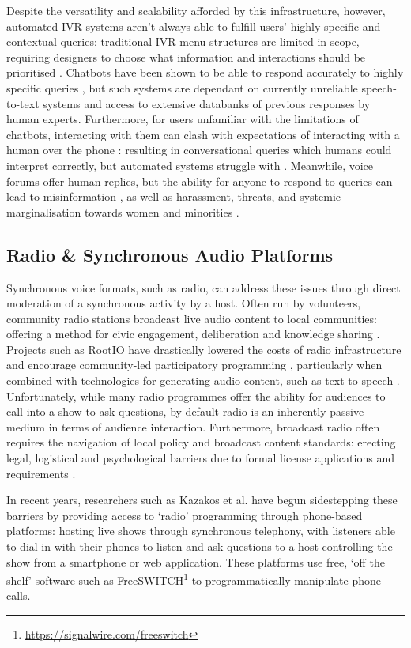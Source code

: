 Despite the versatility and scalability afforded by this infrastructure, however, automated IVR systems aren't always able to fulfill users' highly specific and contextual queries: traditional IVR menu structures are limited in scope, requiring designers to choose what information and interactions should be prioritised \cite{Richardson2022}. Chatbots have been shown to be able to respond accurately to highly specific queries \cite{Jain2018}, but such systems are dependant on currently unreliable speech-to-text systems and access to extensive databanks of previous responses by human experts. Furthermore, for users unfamiliar with the limitations of chatbots, interacting with them can clash with expectations of interacting with a human over the phone \cite{Jain2018}: resulting in conversational queries which humans could interpret correctly, but automated systems struggle with \cite{Yadav2019}. Meanwhile, voice forums offer human replies, but the ability for anyone to respond to queries can lead to misinformation \cite{Patel2010}, as well as harassment, threats, and systemic marginalisation towards women and minorities \cite{Vashistha2019}.

\subsection{Radio \& Synchronous Audio Platforms}
\label{section:talkshow}

Synchronous voice formats, such as radio, can address these issues through direct moderation of a synchronous activity by a host. Often run by volunteers, community radio stations broadcast live audio content to local communities: offering a method for civic engagement, deliberation and knowledge sharing \cite{Cibin2019, Maye2020}. Projects such as RootIO have drastically lowered the costs of radio infrastructure and encourage community-led participatory programming \cite{Csik2016}, particularly when combined with technologies for generating audio content, such as text-to-speech \cite{Scott2020}. Unfortunately, while many radio programmes offer the ability for audiences to call into a show to ask questions, by default radio is an inherently passive medium in terms of audience interaction. Furthermore, broadcast radio often requires the navigation of local policy and broadcast content standards: erecting legal, logistical and psychological barriers due to formal license applications and requirements \cite{Maye2020, Bidwell2021}.

In recent years, researchers such as Kazakos et al. \cite{Kazakos2016} have begun sidestepping these barriers by providing access to `radio' programming through phone-based platforms: hosting live shows through synchronous telephony, with listeners able to dial in with their phones to listen and ask questions to a host controlling the show from a smartphone or web application. These platforms use free, `off the shelf' software such as FreeSWITCH\footnote{\url{https://signalwire.com/freeswitch}} to programmatically manipulate phone calls. 

